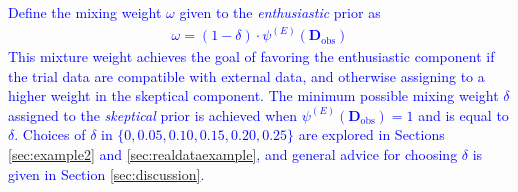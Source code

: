 \documentclass[AMA,STIX1COL,doublespace]{WileyNJD-v2}
\begin{document}
\textcolor{blue}{
Define the mixing weight $\omega$ given to the \textit{enthusiastic} prior as
\begin{align}\label{eq:omega}
\omega= (1 - \delta)\cdot\psi^{(E)}(\mathbf{D}_{\text{obs}})
\end{align}
This mixture weight achieves the goal of favoring the enthusiastic component if the trial data are compatible with external data, and otherwise assigning to a higher weight in the skeptical component. The minimum possible mixing weight $\delta$ assigned to the \textit{skeptical} prior is achieved when $\psi^{(E)}(\mathbf{D}_{\text{obs}})=1$ and is equal to $\delta$. Choices of $\delta$ in $\{0, 0.05, 0.10, 0.15, 0.20, 0.25\}$ are explored in Sections \ref{sec:example2} and \ref{sec:realdataexample}, and general advice for choosing $\delta$ is given in Section \ref{sec:discussion}.}
%
%
\end{document}
